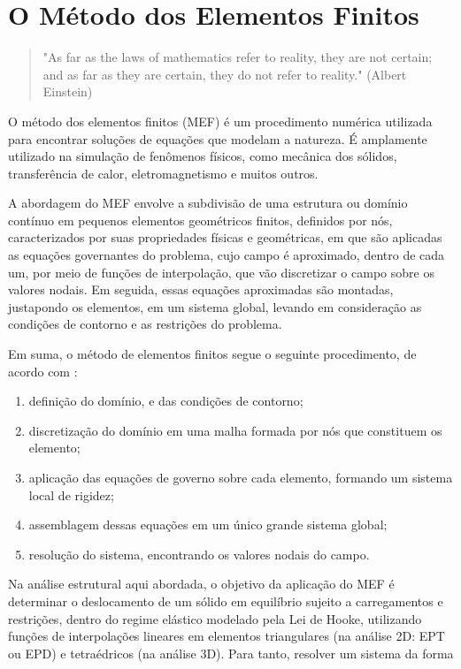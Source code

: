 \chapter{O Método dos Elementos Finitos}

\begin{quote}
    "As far as the laws of mathematics refer to reality, they are not certain; and as far as they are certain, they do not refer to reality." (Albert Einstein)
\end{quote}

O método dos elementos finitos (MEF) é um procedimento numérica utilizada para encontrar soluções de equações que modelam a natureza. É amplamente utilizado na simulação de fenômenos físicos, como mecânica dos sólidos, transferência de calor, eletromagnetismo e muitos outros. \cite{Onate}

A abordagem do MEF envolve a subdivisão de uma estrutura ou domínio contínuo em pequenos elementos geométricos finitos, definidos por nós, caracterizados por suas propriedades físicas e geométricas, em que são aplicadas as equações governantes do problema, cujo campo é aproximado, dentro de cada um, por meio de funções de interpolação, que vão discretizar o campo sobre os valores nodais. Em seguida, essas equações aproximadas são montadas, justapondo os elementos, em um sistema global, levando em consideração as condições de contorno e as restrições do problema. \cite{LIU}

Em suma, o método de elementos finitos segue o seguinte procedimento, de acordo com :

\begin{enumerate}
    \item definição do domínio, e das condições de contorno;
    \item discretização do domínio em uma malha formada por nós que constituem os elemento;
    \item aplicação das equações de governo sobre cada elemento, formando um sistema local de rigidez;
    \item assemblagem dessas equações em um único grande sistema global;
    \item resolução do sistema, encontrando os valores nodais do campo.
\end{enumerate}

Na análise estrutural aqui abordada, o objetivo da aplicação do MEF é determinar o deslocamento de um sólido em equilíbrio sujeito a carregamentos e restrições, dentro do regime elástico modelado pela Lei de Hooke, utilizando funções de interpolações lineares em elementos triangulares (na análise 2D: EPT ou EPD) e tetraédricos (na análise 3D). Para tanto, resolver um sistema da forma


